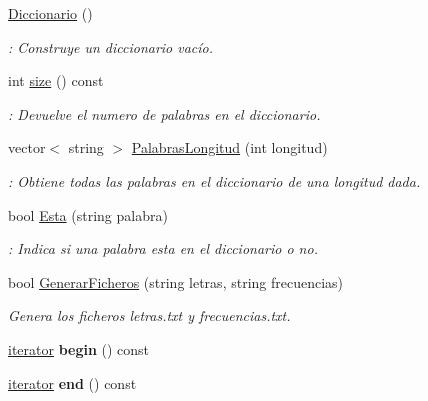 \begin{DoxyCompactItemize}
\item 
\hyperlink{classDiccionario_aa0a2191ec706b256c35b5229cc197b15}{Diccionario} ()\hypertarget{classDiccionario_aa0a2191ec706b256c35b5229cc197b15}{}\label{classDiccionario_aa0a2191ec706b256c35b5229cc197b15}

\begin{DoxyCompactList}\small\item\em \+: Construye un diccionario vacío. \end{DoxyCompactList}\item 
int \hyperlink{classDiccionario_abe2e0023732c4cef7f6960120e8cde39}{size} () const 
\begin{DoxyCompactList}\small\item\em \+: Devuelve el numero de palabras en el diccionario. \end{DoxyCompactList}\item 
vector$<$ string $>$ \hyperlink{classDiccionario_a6ec8594ebcc112eea474ae1ff86629be}{Palabras\+Longitud} (int longitud)
\begin{DoxyCompactList}\small\item\em \+: Obtiene todas las palabras en el diccionario de una longitud dada. \end{DoxyCompactList}\item 
bool \hyperlink{classDiccionario_a2091d415bc53c34a0e78e7bd9b073024}{Esta} (string palabra)
\begin{DoxyCompactList}\small\item\em \+: Indica si una palabra esta en el diccionario o no. \end{DoxyCompactList}\item 
bool \hyperlink{classDiccionario_a2835b073f7ed7a4e0f76ac26d8cc606e}{Generar\+Ficheros} (string letras, string frecuencias)
\begin{DoxyCompactList}\small\item\em Genera los ficheros letras.\+txt y frecuencias.\+txt. \end{DoxyCompactList}\item 
\hyperlink{classDiccionario_1_1iterator}{iterator} {\bfseries begin} () const \hypertarget{classDiccionario_ae30b819caf3ecd8acdc38e74d6d0ab75}{}\label{classDiccionario_ae30b819caf3ecd8acdc38e74d6d0ab75}

\item 
\hyperlink{classDiccionario_1_1iterator}{iterator} {\bfseries end} () const \hypertarget{classDiccionario_aee93efbad85c8a85a88bb2b213b56bcc}{}\label{classDiccionario_aee93efbad85c8a85a88bb2b213b56bcc}

\end{DoxyCompactItemize}
